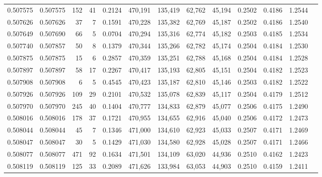 \begin{tabular}{rrrrrrrrrrrrr}
0.507575 & 0.507575 &   152 &    41 &                                     0.2124 & 470,191 & 135,419 &  62,762 &  45,194 & 0.2502 & 0.4186 & 1.2544 \\
0.507626 & 0.507626 &    37 &     7 &                                     0.1591 & 470,228 & 135,382 &  62,769 &  45,187 & 0.2502 & 0.4186 & 1.2540 \\
0.507649 & 0.507690 &    66 &     5 &                                     0.0704 & 470,294 & 135,316 &  62,774 &  45,182 & 0.2503 & 0.4185 & 1.2534 \\
0.507740 & 0.507857 &    50 &     8 &                                     0.1379 & 470,344 & 135,266 &  62,782 &  45,174 & 0.2504 & 0.4184 & 1.2530 \\
0.507875 & 0.507875 &    15 &     6 &                                     0.2857 & 470,359 & 135,251 &  62,788 &  45,168 & 0.2504 & 0.4184 & 1.2528 \\
0.507897 & 0.507897 &    58 &    17 &                                     0.2267 & 470,417 & 135,193 &  62,805 &  45,151 & 0.2504 & 0.4182 & 1.2523 \\
0.507908 & 0.507908 &     6 &     5 &                                     0.4545 & 470,423 & 135,187 &  62,810 &  45,146 & 0.2503 & 0.4182 & 1.2522 \\
0.507926 & 0.507926 &   109 &    29 &                                     0.2101 & 470,532 & 135,078 &  62,839 &  45,117 & 0.2504 & 0.4179 & 1.2512 \\
0.507970 & 0.507970 &   245 &    40 &                                     0.1404 & 470,777 & 134,833 &  62,879 &  45,077 & 0.2506 & 0.4175 & 1.2490 \\
0.508016 & 0.508016 &   178 &    37 &                                     0.1721 & 470,955 & 134,655 &  62,916 &  45,040 & 0.2506 & 0.4172 & 1.2473 \\
0.508044 & 0.508044 &    45 &     7 &                                     0.1346 & 471,000 & 134,610 &  62,923 &  45,033 & 0.2507 & 0.4171 & 1.2469 \\
0.508047 & 0.508047 &    30 &     5 &                                     0.1429 & 471,030 & 134,580 &  62,928 &  45,028 & 0.2507 & 0.4171 & 1.2466 \\
0.508077 & 0.508077 &   471 &    92 &                                     0.1634 & 471,501 & 134,109 &  63,020 &  44,936 & 0.2510 & 0.4162 & 1.2423 \\
0.508119 & 0.508119 &   125 &    33 &                                     0.2089 & 471,626 & 133,984 &  63,053 &  44,903 & 0.2510 & 0.4159 & 1.2411 \\

\end{tabular}
